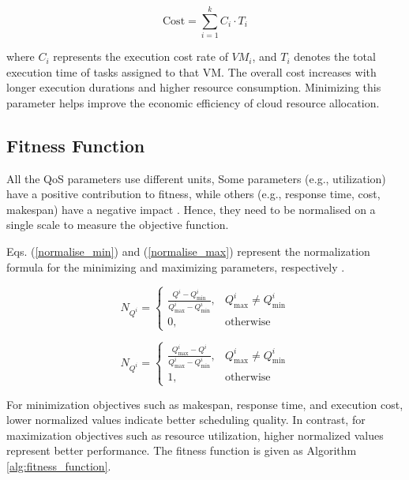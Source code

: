 \documentclass[pdflatex,sn-mathphys-num]{sn-jnl}%
\begin{document}
\begin{equation} \label{cost_eq}
\text{Cost} = \sum_{i=1}^{k} C_i \cdot T_i
\end{equation}

where \( C_i \) represents the execution cost rate of \( VM_i \), and \( T_i \) denotes the total execution time of tasks assigned to that VM. The overall cost increases with longer execution durations and higher resource consumption. Minimizing this parameter helps improve the economic efficiency of cloud resource allocation.

\subsection{Fitness Function}\label{subsec3.3}
All the QoS parameters use different units, Some parameters (e.g., utilization) have a positive contribution to fitness, while others (e.g., response time, cost, makespan) have a negative impact \cite{GWO}. Hence, they need to be normalised on a single scale to measure the objective function.

Eqs. (\ref{normalise_min}) and (\ref{normalise_max}) represent the normalization formula for the minimizing and maximizing parameters, respectively \cite{normalise-HB-cloud-paper}.

\begin{equation} \label{normalise_min}
N_{Q^i} =
\begin{cases}
\frac{Q^i - Q^i_{\min}}
{Q^i_{\max} - Q^i_{\min}},
& Q^i_{\max} \neq Q^i_{\min} \\
0, & \text{otherwise}
\end{cases}
\end{equation}

\begin{equation} \label{normalise_max}
N_{Q^i} =
\begin{cases}
\frac{Q^i_{\max} - Q^i}
{Q^i_{\max} - Q^i_{\min}},
& Q^i_{\max} \neq Q^i_{\min} \\
1, & \text{otherwise}
\end{cases}
\end{equation}

For minimization objectives such as makespan, response time, and execution cost, lower normalized values indicate better scheduling quality. In contrast, for maximization objectives such as resource utilization, higher normalized values represent better performance.
The fitness function is given as Algorithm \ref{alg:fitness_function}.
\end{document}
